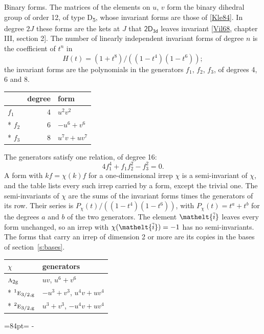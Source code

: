 \documentclass[10pt,a4paper]{article}
\makeatletter
\renewcommand\paragraph{\@startsection{paragraph}{4}{\z@}{1.5ex plus .5ex minus .2ex}{-1em}%
  {\normalfont\small\sffamily\bfseries\color{parttitle}}}
\newcommand{\needspace}[1]{\par\penalty-100\begingroup\dimen0=#1\relax\dimen2=\pagegoal
  \advance\dimen2-\pagetotal\ifdim\dimen0>\dimen2\relax\ifdim\dimen2>0pt\vfil\break\fi\fi
  \endgroup}
\numberwithin{equation}{section}
\newcommand{\eltfont}[1]{{\let\sigma\eltsigma\mathelt{#1}}}
\newcommand{\grp}[1]{\mathsf{#1}}
\newcommand{\irr}[1]{\text{\normalfont\scshape #1}}
\newcommand{\conjpair}[1]{{}^{#1}}
\newcommand{\elt}[1]{\eltfont{#1}}
\newcommand{\ptag}[1]{\mathrm{#1}}
\newcommand{\lift}[1]{\tilde{#1}}
\makeatother
\begin{document}
\paragraph{Binary forms.}
The matrices of the elements on $u$, $v$ form the binary dihedral group of order 12, of type D\textsubscript{5}, whose invariant forms are those of [\href{../../../REFERENCES.pdf\#ref.Kle84}{Kle84}]. In degree $2J$ these forms are the kets at $J$ that $\grp{2D_{3d}}$ leaves invariant [\href{../../../REFERENCES.pdf\#ref.Vil68}{Vil68}, chapter III, section 2]. \label{n:head.degree}\label{n:head.form}The number of linearly independent invariant forms of degree $n$ is the coefficient of $t^n$ in
\begin{equation}\label{e:molien}H(t) = (1 + t^{8})/((1-t^{4})(1-t^{6}));\end{equation}
the invariant forms are the polynomials in the generators $f_1$, $f_2$, $f_3$, of degrees 4, 6 and 8.
{\small\begin{longtable}{@{}lrl@{}}\toprule
& degree & form\\\midrule\endhead
\bottomrule\endfoot\endlastfoot
$f_{1}$ & 4 & $u^{2}v^{2}$\\*
$f_{2}$ & 6 & $-u^{6} + v^{6}$\\*
$f_{3}$ & 8 & $u^{7}v + uv^{7}$\\
\bottomrule\end{longtable}}
The generators satisfy one relation, of degree 16:
\begin{equation}\label{e:relation}4f_{1}^{4} + f_{1}f_{2}^{2} - f_{3}^{2} = 0.\end{equation}
A form with $k f = \chi(k) f$ for a one-dimensional irrep $\chi$ is a semi-invariant of $\chi$, and the table lists every such irrep carried by a form, except the trivial one. \label{n:head.generators}The semi-invariants of $\chi$ are the sums of the invariant forms times the generators of its row. Their series is $P_\chi(t)/((1-t^{4})(1-t^{6}))$, with $P_\chi(t) = t^{a} + t^{b}$ for the degrees $a$ and $b$ of the two generators. The element $\elt{\lift{i}}$ leaves every form unchanged, so an irrep with $\chi(\elt{\lift{i}}) = -1$ has no semi-invariants. The forms that carry an irrep of dimension 2 or more are its copies in the bases of section~\ref{s:bases}.
{\small\begin{longtable}{@{}ll@{}}\toprule
$\chi$ & generators\\\midrule\endhead
\bottomrule\endfoot\endlastfoot
$\irr{a}_{2\ptag{g}}$ & $uv$, $u^{6} + v^{6}$\\*
$\conjpair{1}\irr{e}_{3/2,\ptag{g}}$ & $-u^{3} + v^{3}$, $u^{4}v + uv^{4}$\\*
$\conjpair{2}\irr{e}_{3/2,\ptag{g}}$ & $u^{3} + v^{3}$, $-u^{4}v + uv^{4}$\\
\bottomrule\end{longtable}}
\needspace{84pt}
\end{document}

